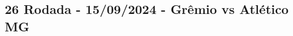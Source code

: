\newpage
\subsection{26 Rodada - 15/09/2024 - Grêmio vs Atlético MG}

\begin{figure}[H]
    \centering
    
\end{figure}